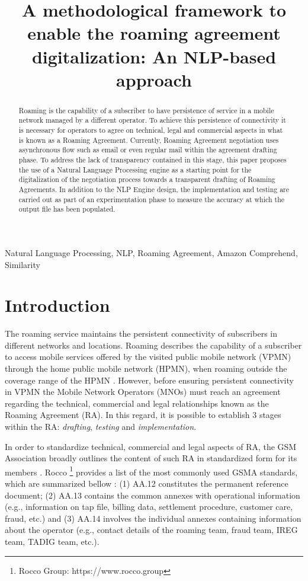 \documentclass[conference]{style/IEEEtran}
\begin{document}
\title{A methodological framework to enable the roaming agreement digitalization: An NLP-based approach\\}

\maketitle

\begin{abstract}
Roaming is the capability of a subscriber to have persistence of service in a mobile network managed by a different operator. To achieve this persistence of connectivity it is necessary for operators to agree on technical, legal and commercial aspects in what is known as a Roaming Agreement. Currently, Roaming Agreement negotiation uses asynchronous flow such as email or even regular mail within the agreement drafting phase. To address the lack of transparency contained in this stage, this paper proposes the use of a Natural Language Processing engine as a starting point for the digitalization of the negotiation process towards a transparent drafting of Roaming Agreements. In addition to the NLP Engine design, the implementation and testing are carried out as part of an experimentation phase to measure the accuracy at which the output file has been populated.
\end{abstract}

\begin{IEEEkeywords}
Natural Language Processing, NLP, Roaming Agreement, Amazon Comprehend, Similarity
\end{IEEEkeywords}

\section{Introduction}
The roaming service maintains the persistent connectivity of subscribers in different networks and locations. Roaming describes the capability of a subscriber to access mobile services offered by the visited public mobile network (VPMN) through the home public mobile network (HPMN), when roaming outside the coverage range of the HPMN \cite{Tanaka2013}. However, before ensuring persistent connectivity in VPMN the Mobile Network Operators (MNOs) must reach an agreement regarding the technical, commercial and legal relationships known as the Roaming Agreement (RA). In this regard, it is possible to establish 3 stages within the RA: \textit{drafting}, \textit{testing} and \textit{implementation}.

In order to standardize technical, commercial and legal aspects of RA, the GSM Association broadly outlines the content of such RA in standardized form for its members \cite{Ferwerda2018}. Rocco \footnote{Rocco Group: https://www.rocco.group} provides a list of the most commonly used GSMA standards, which are summarized bellow \cite{ROCCO2017}: (1) AA.12 constitutes the permanent reference document; (2) AA.13 contains the common annexes with operational information (e.g., information on tap file, billing data, settlement procedure, customer care, fraud, etc.) and (3) AA.14 involves the individual annexes containing information about the operator (e.g., contact details of the roaming team, fraud team, IREG team, TADIG team, etc.).
\end{document}
